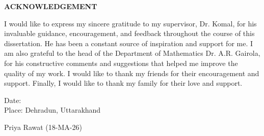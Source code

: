 \begin{center}
  {\LARGE{\bf{ACKNOWLEDGEMENT}}}
\end{center}

\vspace{2em}



I would like to express my sincere gratitude to my supervisor, Dr. Komal, for his invaluable guidance, encouragement, and feedback throughout the course of this dissertation. He has been a constant source of inspiration and support for me.
I am also grateful to the head of the Department of Mathematics Dr. A.R. Gairola, for his constructive comments and suggestions that helped me improve the quality of my work. I would like to thank my friends for their encouragement and support. Finally, I would like to thank my family for their love and support.

\vfill

\begin{minipage}{2.5in}
Date:  \\
Place: Dehradun, Uttarakhand
\end{minipage}
\hfill
\begin{minipage}{2in}
Priya Rawat (18-MA-26) \\
\end{minipage}
